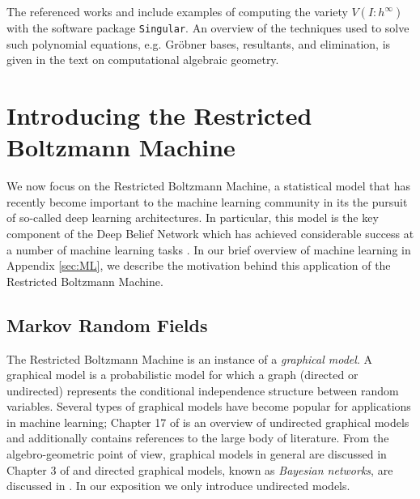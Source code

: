 \documentclass[11pt,titlepage]{article}
\numberwithin{equation}{section}
\begin{document}
    The referenced works \cite{ASCB} and \cite{DSS08} include examples of
    computing the variety $V(I : h^\infty)$ with the software package
    \texttt{Singular}.  An overview of the techniques used to solve such
    polynomial equations, e.g. Gröbner bases, resultants, and elimination, is
    given in the text \cite{CLO05} on computational algebraic geometry.
% 






\section{Introducing the Restricted Boltzmann Machine}

    We now focus on the Restricted Boltzmann Machine, a statistical model that
    has recently become important to the machine learning community in its the
    pursuit of so-called deep learning architectures.  In particular, this
    model is the key component of the Deep Belief Network which has achieved
    considerable success at a number of machine learning tasks \cite{Hin07}.  In
    our brief overview of machine learning in Appendix \ref{sec:ML}, we describe
    the motivation behind this application of the Restricted Boltzmann Machine.

\subsection{Markov Random Fields}
    \label{sec:rbm-def}

    The Restricted Boltzmann Machine is an instance of a \emph{graphical model}.
    A graphical model is a probabilistic model for which a graph (directed or
    undirected) represents the conditional independence structure between random
    variables.  Several types of graphical models have become popular for
    applications in machine learning; Chapter 17 of \cite{EOSL} is an overview
    of undirected graphical models and additionally contains references to the
    large body of literature.  From the algebro-geometric point of view,
    graphical models in general are discussed in Chapter 3 of \cite{DSS08} and
    directed graphical models, known as \emph{Bayesian networks}, are discussed
    in \cite{GSS}.  In our exposition we only introduce undirected models.
\end{document}
